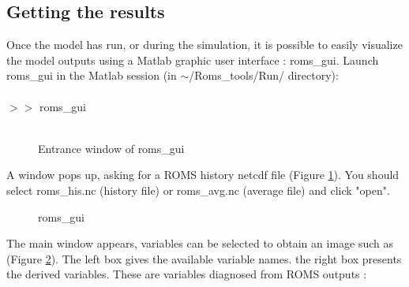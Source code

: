 \subsection{Getting the results}

Once the model has run, or during the simulation, it is possible
to easily visualize the model outputs using a Matlab graphic user interface : 
roms\_gui. Launch roms\_gui in the Matlab session 
(in $\sim$/Roms\_tools/Run/ directory):
\\ \\
$>>$ roms\_gui
\\ \\
\begin{figure}[!ht]
\centerline{}
\caption{Entrance window of roms\_gui}
\label{fig:open}
\end{figure}

A window pops up, asking for a ROMS history netcdf file (Figure \ref{fig:open}).
You should select roms\_his.nc (history file) or roms\_avg.nc (average file) and
click "open".
 
\begin{figure}[!ht]
\centerline{}
\caption{roms\_gui}
\label{fig:romsgui}
\end{figure}

The main window appears, variables can be selected to obtain an image such as
(Figure \ref{fig:romsgui}). The left box  gives the available variable names.
the right box presents the derived variables. These are variables diagnosed
from ROMS outputs :

